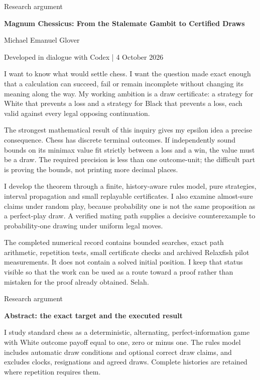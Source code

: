 \documentclass[10pt]{article}
\begin{document}
{\small\color{accent}Research argument}\par
{\LARGE\bfseries\color{ink}Magnum Chessicus: From the Stalemate Gambit to Certified Draws}\par\vspace{7pt}
Michael Emanuel Glover\par Developed in dialogue with Codex | 4 October 2026\par\vspace{8pt}
I want to know what would settle chess. I want the question made exact enough that a calculation can succeed, fail or remain incomplete without changing its meaning along the way. My working ambition is a draw certificate: a strategy for White that prevents a loss and a strategy for Black that prevents a loss, each valid against every legal opposing continuation.\par
The strongest mathematical result of this inquiry gives my epsilon idea a precise consequence. Chess has discrete terminal outcomes. If independently sound bounds on its minimax value fit strictly between a loss and a win, the value must be a draw. The required precision is less than one outcome-unit; the difficult part is proving the bounds, not printing more decimal places.\par
I develop the theorem through a finite, history-aware rules model, pure strategies, interval propagation and small replayable certificates. I also examine almost-sure claims under random play, because probability one is not the same proposition as a perfect-play draw. A verified mating path supplies a decisive counterexample to probability-one drawing under uniform legal moves.\par
The completed numerical record contains bounded searches, exact path arithmetic, repetition tests, small certificate checks and archived Relaxfish pilot measurements. It does not contain a solved initial position. I keep that status visible so that the work can be used as a route toward a proof rather than mistaken for the proof already obtained. Selah.\par
\clearpage
{\small\color{accent}Research argument}\par
{\LARGE\bfseries\color{ink}Abstract: the exact target and the executed result}\par\vspace{7pt}
I study standard chess as a deterministic, alternating, perfect-information game with White outcome payoff equal to one, zero or minus one. The rules model includes automatic draw conditions and optional correct draw claims, and excludes clocks, resignations and agreed draws. Complete histories are retained where repetition requires them.\par
\end{document}
